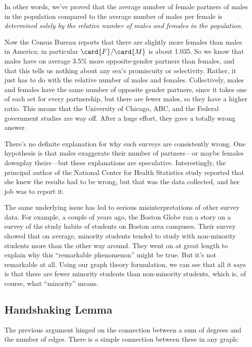 In other words, we've proved that the average number of female
partners of males in the population compared to the average number of
males per female is \emph{determined solely by the relative number of
  males and females in the population}.

Now the Census Bureau reports that there are slightly more females
than males in America; in particular $\card{F} / \card{M}$ is about
1.035.  So we know that males have on average 3.5\% more
opposite-gender partners than females, and that this tells us nothing about
any sex's promiscuity or selectivity.  Rather, it just has to do with
the relative number of males and females.  Collectively, males and
females have the same number of opposite gender partners, since it
takes one of each set for every partnership, but there are fewer
males, so they have a higher ratio.  This means that the University of
Chicago, ABC, and the Federal government studies are way off.  After a
huge effort, they gave a totally wrong answer.

There's no definite explanation for why such surveys are consistently
wrong.  One hypothesis is that males exaggerate their number of
partners---or maybe females downplay theirs---but these explanations
are speculative.  Interestingly, the principal author of the National
Center for Health Statistics study reported that she knew the results
had to be wrong, but that was the data collected, and her job was to
report it.

The same underlying issue has led to serious misinterpretations of
other survey data.  For example, a couple of years ago, the Boston
Globe ran a story on a survey of the study habits of students on
Boston area campuses.  Their survey showed that on average, minority
students tended to study with non-minority students more than the
other way around.  They went on at great length to explain why this
``remarkable phenomenon'' might be true.  But it's not remarkable at
all.  Using our graph theory formulation, we can see that all it says
is that there are fewer minority students than non-minority students,
which is, of course, what ``minority'' means.

\subsection{Handshaking Lemma} 
The previous argument hinged on the connection between a sum of
degrees and the number of edges.  There is a simple connection between
these in any graph:

